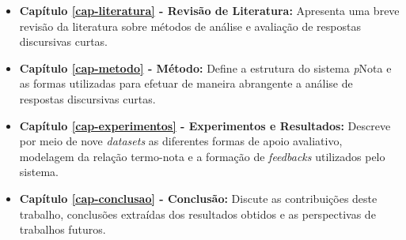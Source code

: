\begin{itemize}
\item \textbf{Capítulo \ref{cap-literatura} - Revisão de Literatura:} Apresenta uma breve revisão da literatura sobre métodos de análise e avaliação de respostas discursivas curtas.

\item \textbf{Capítulo \ref{cap-metodo} - Método:} Define a estrutura do sistema \textit{p}Nota e as formas utilizadas para efetuar de maneira abrangente a análise de respostas discursivas curtas.

\item \textbf{Capítulo \ref{cap-experimentos} - Experimentos e Resultados:} Descreve por meio de nove \textit{datasets} as diferentes formas de apoio avaliativo, modelagem da relação termo-nota e a formação de \textit{feedbacks} utilizados pelo sistema.

\item \textbf{Capítulo \ref{cap-conclusao} - Conclusão:} Discute as contribuições deste trabalho, conclusões extraídas dos resultados obtidos e as perspectivas de trabalhos futuros.

\end{itemize}
